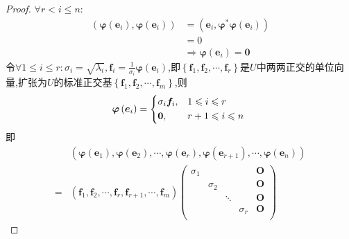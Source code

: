 {\begin{proof}
        $\forall r<i\leqslant n:$
        \begin{align*}
            \left(
            \bm{\varphi}\left(
                \bm{e}_i
                \right),\bm{\varphi}\left(
                \bm{e}_i
                \right)
            \right) & =\left(
            \bm{e}_i,\bm{\varphi}^*\bm{\varphi}\left(
                \bm{e}_i
                \right)
            \right)                                     \\
                    & =0                                \\
                    & \Longrightarrow\bm{\varphi}\left(
            \bm{e}_i
            \right)=\bm{0}
        \end{align*}令$\displaystyle\forall1\leqslant i\leqslant r:\sigma_i=\sqrt{\lambda_i},\bm{f}_i=\frac{1}{\sigma_i}\bm{\varphi}\left(\bm{e}_i\right)$,即$\left\{
            \bm{f}_1,\bm{f}_2,\cdots,\bm{f}_r
            \right\}$是$U$中两两正交的单位向量,扩张为$U$的标准正交基$\left\{
            \bm{f}_1,\bm{f}_2,\cdots,\bm{f}_m
            \right\}$,则\[
            \bm{\varphi}\left(\bm{e}_i\right)=\begin{cases*}
                \sigma_i\bm{f}_i, & $1\leqslant i\leqslant r$   \\
                \bm{0},           & $r+1\leqslant i\leqslant n$
            \end{cases*}
        \]即\begin{align*}
              & \left(
            \bm{\varphi}\left(
                \bm{e}_1
                \right),\bm{\varphi}\left(
                \bm{e}_2
                \right)
            ,\cdots,\bm{\varphi}\left(
                \bm{e}_r
                \right),\bm{\varphi}\left(
                \bm{e}_{r+1}
                \right),\cdots,\bm{\varphi}\left(
                \bm{e}_n
                \right)
            \right)    \\
            = & \left(
            \bm{f}_1,\bm{f}_2,\cdots,\bm{f}_r,\bm{f}_{r+1},\cdots,\bm{f}_m
            \right)\begin{pmatrix}
                       \sigma_1 &          &        &          & \bm{O} \\
                                & \sigma_2 &        &          & \bm{O} \\
                                &          & \ddots &          & \bm{O} \\
                                &          &        & \sigma_r & \bm{O} \\

\end{pmatrix}
\end{align*}
\end{proof}}
